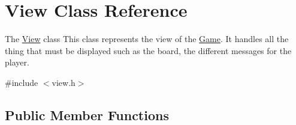 \hypertarget{class_view}{}\section{View Class Reference}
\label{class_view}


The \hyperlink{class_view}{View} class This class represents the view of the \hyperlink{class_game}{Game}. It handles all the thing that must be displayed such as the board, the different messages for the player.  




{\ttfamily \#include $<$view.\+h$>$}

\subsection*{Public Member Functions}
